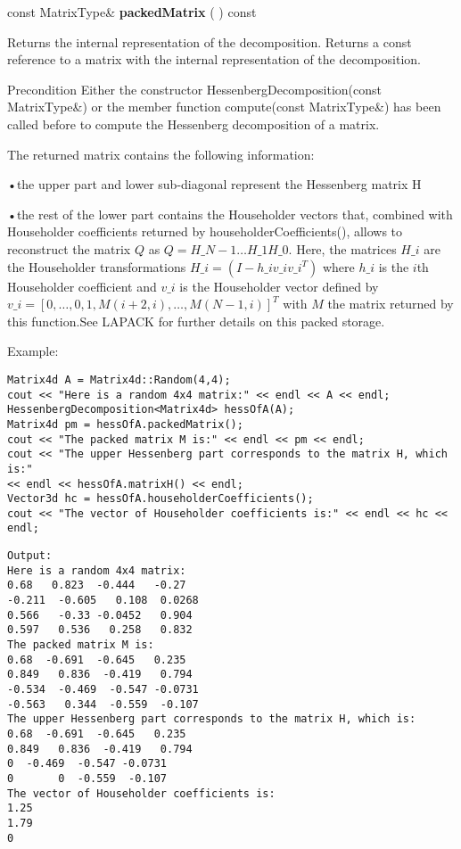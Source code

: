 \vspace{0.3cm}
const MatrixType\& \textbf{packedMatrix}  ( )  const 

Returns the internal representation of the decomposition. 
Returns a const reference to a matrix with the internal representation of the decomposition.

Precondition
Either the constructor HessenbergDecomposition(const MatrixType\&) or the member function compute(const MatrixType\&) has been called before to compute the Hessenberg decomposition of a matrix.

The returned matrix contains the following information:

•the upper part and lower sub-diagonal represent the Hessenberg matrix H

•the rest of the lower part contains the Householder vectors that, combined with Householder coefficients returned by householderCoefficients(), allows to reconstruct the matrix $Q$ as $Q = H\_{N-1}\ldots H\_1 H\_0$. Here, the matrices $H\_i$ are the Householder transformations $H\_i=(I - h\_i v\_i v\_i^T)$ where $h\_i$  is the $i$th Householder coefficient and $v\_i$ is the Householder vector defined by $v\_i=[0,\ldots,0,1,M(i+2,i),\ldots,M(N-1,i)]^T$ with $M$ the matrix returned by this function.See LAPACK for further details on this packed storage.


Example:
\begin{lstlisting}
Matrix4d A = Matrix4d::Random(4,4);
cout << "Here is a random 4x4 matrix:" << endl << A << endl;
HessenbergDecomposition<Matrix4d> hessOfA(A);
Matrix4d pm = hessOfA.packedMatrix();
cout << "The packed matrix M is:" << endl << pm << endl;
cout << "The upper Hessenberg part corresponds to the matrix H, which is:"
<< endl << hessOfA.matrixH() << endl;
Vector3d hc = hessOfA.householderCoefficients();
cout << "The vector of Householder coefficients is:" << endl << hc << endl;
\end{lstlisting}

\begin{verbatim}
Output:
Here is a random 4x4 matrix:
0.68   0.823  -0.444   -0.27
-0.211  -0.605   0.108  0.0268
0.566   -0.33 -0.0452   0.904
0.597   0.536   0.258   0.832
The packed matrix M is:
0.68  -0.691  -0.645   0.235
0.849   0.836  -0.419   0.794
-0.534  -0.469  -0.547 -0.0731
-0.563   0.344  -0.559  -0.107
The upper Hessenberg part corresponds to the matrix H, which is:
0.68  -0.691  -0.645   0.235
0.849   0.836  -0.419   0.794
0  -0.469  -0.547 -0.0731
0       0  -0.559  -0.107
The vector of Householder coefficients is:
1.25
1.79
0
\end{verbatim}

